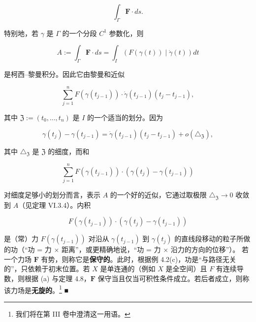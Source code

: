 \begin{remark}
\begin{items}
\[
\int_{\Gamma}\boldsymbol{F}\cdot ds .
\]

特别地，若 $ \gamma $ 是 $ \Gamma $ 的一个分段 $ C^{1} $ 参数化，则

\[
A := \int_{\Gamma}\boldsymbol{F}\cdot ds = \int_{I}\left(F(\gamma(t))\mid\dot{\gamma}(t)\right)dt
\]

是柯西–黎曼积分。因此它由黎曼和近似

\[
\sum_{j=1}^{n}F(\gamma(t_{j-1}))\cdot\dot{\gamma}(t_{j-1})(t_{j} - t_{j-1}) ,
\]

其中 $ \mathfrak{Z} := (t_{0},\ldots,t_{n}) $ 是 $ I $ 的一个适当的划分。因为

\[
\gamma(t_{j}) - \gamma(t_{j-1}) = \dot{\gamma}(t_{j-1})(t_{j} - t_{j-1}) + o(\triangle_{\mathfrak{Z}}) ,
\]

其中 $ \triangle_{\mathfrak{Z}} $ 是 $ \mathfrak{Z} $ 的细度，而和

\[
\sum_{j=1}^{n}F(\gamma(t_{j-1}))\cdot\left(\gamma(t_{j}) - \gamma(t_{j-1})\right)
\]

对细度足够小的划分而言，表示 $ A $ 的一个好的近似，它通过取极限 $ \triangle_{\mathfrak{Z}} \to 0 $ 收敛到 $ A $（见定理 VI.3.4）。内积

\[
F(\gamma(t_{j-1}))\cdot\left(\gamma(t_{j}) - \gamma(t_{j-1})\right)
\]

是（常）力 $ F(\gamma(t_{j-1})) $ 对沿从 $ \gamma(t_{j-1}) $ 到 $ \gamma(t_{j}) $ 的直线段移动的粒子所做的功（“功 = 力 $ \times $ 距离”，或更精确地说，“功 = 力 $ \times $ 沿力的方向的位移”）。
若一个力场 $ \boldsymbol{F} $ 有势，则称它是\textbf{保守的}。此时，根据例 4.2(c)，功是“与路径无关的”，只依赖于初末位置。若 $ X $ 是单连通的（例如 $ X $ 是全空间）且 $ F $ 有连续导数，则根据 (a) 与定理 4.8，$ \boldsymbol{F} $ 保守当且仅当可积性条件成立。若后者成立，则称该力场是\textbf{无旋的}。\footnote{我们将在第 III 卷中澄清这一用语。} \nobreak\hspace{0.35em}■

\end{items}

\end{remark}

\exerciseshead


